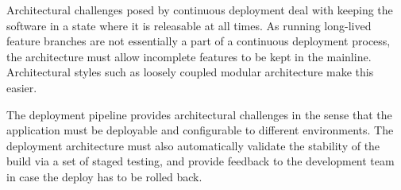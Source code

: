 \documentclass[conference]{IEEEtran}
\begin{document}
Architectural challenges posed by continuous deployment deal with keeping the software in a state where it is releasable at all times. As running long-lived feature branches are not essentially a part of a continuous deployment process, the architecture must allow incomplete features to be kept in the mainline. Architectural styles such as loosely coupled modular architecture make this easier.

The deployment pipeline provides architectural challenges in the sense that the application must be deployable and configurable to different environments. The deployment architecture must also automatically validate the stability of the build via a set of staged testing, and provide feedback to the development team in case the deploy has to be rolled back.
{}


\end{document}
